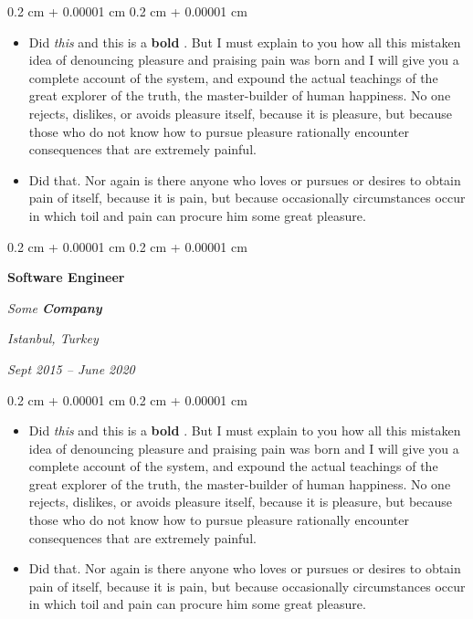 \documentclass[10pt, letterpaper]{article}
\newenvironment{highlights}{
    \begin{itemize}[
        topsep=0.10 cm,
        parsep=0.10 cm,
        partopsep=0pt,
        itemsep=0pt,
        leftmargin=0.4 cm + 10pt
    ]
}{
    \end{itemize}
} %
\newenvironment{onecolentry}{
    \begin{adjustwidth}{
        0.2 cm + 0.00001 cm
    }{
        0.2 cm + 0.00001 cm
    }
}{
    \end{adjustwidth}
} %
\newenvironment{twocolentry}[2][]{
    \onecolentry
    \def\secondColumn{#2}
    \setcolumnwidth{\fill, 4.5 cm}
    \begin{paracol}{2}
}{
    \switchcolumn \raggedleft \secondColumn
    \end{paracol}
    \endonecolentry
} %
\let\hrefWithoutArrow\href
\renewcommand{\href}[2]{\hrefWithoutArrow{#1}{\ifthenelse{\equal{#2}{}}{ }{#2 }\raisebox{.15ex}{\footnotesize \faExternalLink*}}}
\begin{document}
        \vspace{0.10 cm}
        \begin{onecolentry}
            \begin{highlights}
                \item Did \textit{this} and this is a \textbf{bold} \href{https://example.com}{link}. But I must explain to you how all this mistaken idea of denouncing pleasure and praising pain was born and I will give you a complete account of the system, and expound the actual teachings of the great explorer of the truth, the master-builder of human happiness. No one rejects, dislikes, or avoids pleasure itself, because it is pleasure, but because those who do not know how to pursue pleasure rationally encounter consequences that are extremely painful.
                \item Did that. Nor again is there anyone who loves or pursues or desires to obtain pain of itself, because it is pain, but because occasionally circumstances occur in which toil and pain can procure him some great pleasure.
            \end{highlights}
        \end{onecolentry}


        \vspace{0.2 cm}

        \begin{twocolentry}{
        \textit{Istanbul, Turkey}    
            
        \textit{Sept 2015 – June 2020}}
            \textbf{Software Engineer}
            
            \textit{Some \textbf{Company}}
        \end{twocolentry}

        \vspace{0.10 cm}
        \begin{onecolentry}
            \begin{highlights}
                \item Did \textit{this} and this is a \textbf{bold} \href{https://example.com}{link}. But I must explain to you how all this mistaken idea of denouncing pleasure and praising pain was born and I will give you a complete account of the system, and expound the actual teachings of the great explorer of the truth, the master-builder of human happiness. No one rejects, dislikes, or avoids pleasure itself, because it is pleasure, but because those who do not know how to pursue pleasure rationally encounter consequences that are extremely painful.
                \item Did that. Nor again is there anyone who loves or pursues or desires to obtain pain of itself, because it is pain, but because occasionally circumstances occur in which toil and pain can procure him some great pleasure.
            \end{highlights}
        \end{onecolentry}
\end{document}
